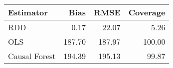 \begin{table}[ht]
\centering
\begin{tabular}{lrrr}
  \hline
Estimator & Bias & RMSE & Coverage \\ 
  \hline
RDD & 0.17 & 22.07 & 5.26 \\ 
  OLS & 187.70 & 187.97 & 100.00 \\ 
  Causal Forest & 194.39 & 195.13 & 99.87 \\ 
   \hline
\end{tabular}
\end{table}
